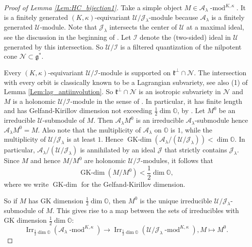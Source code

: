 \documentclass[12pt]{amsart}
\newcommand{\A}{\mathcal{A}}
\newcommand{\U}{\mathcal{U}}
\newcommand{\J}{\mathcal{J}}
\newcommand{\g}{\mathfrak{g}}
\newcommand{\Orb}{\mathbb{O}}
\newcommand{\kf}{\mathfrak{k}}
\theoremstyle{definition}
\numberwithin{equation}{section}
\begin{document}
\begin{proof}[Proof of Lemma \ref{Lem:HC_bijection1}]
Take a simple object  $M\in\A_\lambda\operatorname{-mod}^{K,\kappa}$.
It is a finitely generated $(K,\kappa)$-equivariant $\U/\J_\lambda$-module
because $\A_\lambda$ is a finitely generated $\U$-module.
Note that $\J_\lambda$
intersects the center of $\U$ at a maximal ideal, see the discussion in
the beginning of \cite[Section 5.3]{orbit}. Let $\mathcal{I}$ denote
the (two-sided) ideal in $\U$ generated by this intersection. So $\U/\mathcal{I}$
is a filtered quantization of the nilpotent cone  $\mathcal{N}\subset \g^*$.

Every $(K,\kappa)$-equivariant $\U/\mathcal{I}$-module is supported on
$\kf^\perp\cap \mathcal{N}$. The intersection with every orbit is classically
known to be a Lagrangian subvariety, see also (1) of
Lemma \ref{Lem:lag_antiinvolution}. So $\kf^\perp\cap \mathcal{N}$ is an
isotropic subvariety  in $\mathcal{N}$ and $M$ is a holonomic $\U/\mathcal{I}$-module  in the sense of \cite[Section 1.4]{B_ineq}.
In particular, it  has finite length and has Gelfand-Kirillov dimension
not exceeding $\frac{1}{2}\dim \Orb$, by \cite[Theorems 1.2,1.3]{B_ineq}.
Let $M^0$ be an irreducible $\U$-submodule of $M$. Then $\A_\lambda M^0$
is an irreducible $\A_\lambda$-submodule hence $\A_\lambda M^0=M$.
Also note that the multiplicity of $\A_\lambda$ on $\Orb$ is $1$, while the multiplicity of
$\U/\J_\lambda$ is at least $1$.  Hence $\operatorname{GK-dim}(\A_\lambda/ (\U/\J_\lambda))<\dim \Orb$.
In particular, $\A_\lambda/(\U/\J_\lambda)$ is annihilated by an ideal $\J$
that strictly contains $\J_\lambda$. Since $M$ and hence $M/M^0$ are holonomic $\U/\mathcal{I}$-modules, it follows that
$$\operatorname{GK-dim}(M/M^0)<\frac{1}{2}\dim \Orb,$$
where we write $\operatorname{GK-dim}$ for the Gelfand-Kirillov dimension.

So if $M$ has GK dimension $\frac{1}{2}\dim \Orb$, then $M^0$ is the unique irreducible $\U/\J_\lambda$-submodule of $M$. This gives rise to a
map between the sets of irreducibles with GK dimension $\frac{1}{2}\dim \Orb$:
 $$\operatorname{Irr}_{\frac{1}{2}\dim \Orb}(\A_\lambda\operatorname{-mod}^{K,\kappa})\rightarrow \operatorname{Irr}_{\frac{1}{2}\dim \Orb}(\U/\J_\lambda\operatorname{-mod}^{K,\kappa}),
M\mapsto M^0.$$


\end{proof}
\end{document}
